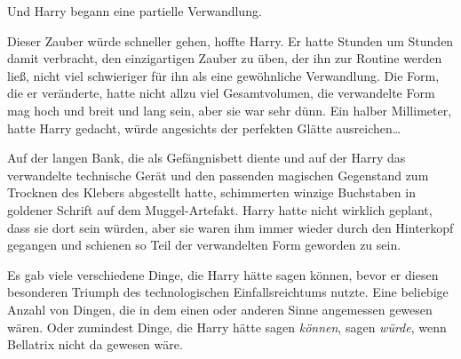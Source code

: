 Und Harry begann eine partielle Verwandlung.

Dieser Zauber würde schneller gehen, hoffte Harry. Er hatte Stunden um Stunden damit verbracht, den einzigartigen Zauber zu üben, der ihn zur Routine werden ließ, nicht viel schwieriger für ihn als eine gewöhnliche Verwandlung. Die Form, die er veränderte, hatte nicht allzu viel Gesamtvolumen, die verwandelte Form mag hoch und breit und lang sein, aber sie war sehr dünn. Ein halber Millimeter, hatte Harry gedacht, würde angesichts der perfekten Glätte ausreichen…

Auf der langen Bank, die als Gefängnisbett diente und auf der Harry das verwandelte technische Gerät und den passenden magischen Gegenstand zum Trocknen des Klebers abgestellt hatte, schimmerten winzige Buchstaben in goldener Schrift auf dem Muggel-Artefakt. Harry hatte nicht wirklich geplant, dass sie dort sein würden, aber sie waren ihm immer wieder durch den Hinterkopf gegangen und schienen so Teil der verwandelten Form geworden zu sein.

Es gab viele verschiedene Dinge, die Harry hätte sagen können, bevor er diesen besonderen Triumph des technologischen Einfallsreichtums nutzte. Eine beliebige Anzahl von Dingen, die in dem einen oder anderen Sinne angemessen gewesen wären. Oder zumindest Dinge, die Harry hätte sagen \emph{können}, sagen \emph{würde}, wenn Bellatrix nicht da gewesen wäre.

